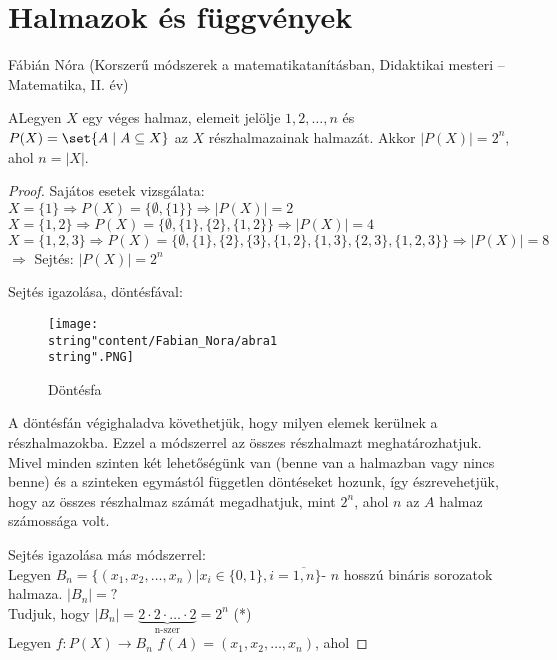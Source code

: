 
\chapter{Halmazok és függvények}\label{chap:halmazok}
\begin{description}
	{\large \item [{Szerző:}] Fábián Nóra (Korszerű módszerek a matematikatanításban, Didaktikai mesteri -- Matematika, 
		II. év)}
	
\end{description}
\begin{theorem}%
	ALegyen $X$ egy véges halmaz, elemeit jelölje $1,2,\dots,n$ és $P(X)=\set{A\mid A\subseteq X}$
	az $X$ részhalmazainak halmazát. Akkor $\left|P(X)\right|=2^{n}$,
	ahol $n=\left|X\right|$. 
\end{theorem}
\begin{proof}
	Sajátos esetek vizsgálata: \\
	$X=\{1\}\Rightarrow P(X)=\{\emptyset,\{1\}\}\Rightarrow|P(X)|=2$
	\\
	$X=\{1,2\}\Rightarrow P(X)=\{\emptyset,\{1\},\{2\},\{1,2\}\}\Rightarrow|P(X)|=4$
	\\
	$X=\{1,2,3\}\Rightarrow P(X)=\{\emptyset,\{1\},\{2\},\{3\},\{1,2\},\{1,3\},\{2,3\},\{1,2,3\}\}\Rightarrow|P(X)|=8$
	\\
	$\Rightarrow$ Sejtés: $|P(X)|=2^{n}$
	
	Sejtés igazolása, döntésfával: 
	\begin{figure}[h]
		\centering \texttt{[image: \\string"content/Fabian\_Nora/abra1\\string".PNG]}
		\caption{Döntésfa}
		\label{abra} 
	\end{figure}
	
	A döntésfán végighaladva követhetjük, hogy milyen elemek kerülnek
	a részhalmazokba. Ezzel a módszerrel az összes részhalmazt meghatározhatjuk.
	Mivel minden szinten két lehetőségünk van (benne van a halmazban vagy
	nincs benne) és a szinteken egymástól független döntéseket hozunk,
	így észrevehetjük, hogy az összes részhalmaz számát megadhatjuk, mint
	$2^{n}$, ahol $n$ az $A$ halmaz számossága volt.
	
	Sejtés igazolása más módszerrel: \\
	Legyen $B_{n}=\{(x_{1},x_{2},\ldots,x_{n})|x_{i}\in\{0,1\},i=\overline{1,n}\}$-
	$n$ hosszú bináris sorozatok halmaza. $|B_{n}|=?$ \\
	Tudjuk, hogy $|B_{n}|=\underbrace{2\cdot2\cdot\ldots\cdot2}_{\text{n-szer}}=2^{n}$
	({*}) \\
	Legyen $f:P(X)\rightarrow B_{n}$ $f(A)=(x_{1},x_{2},\ldots,x_{n})$,
	ahol
	

\end{proof}
